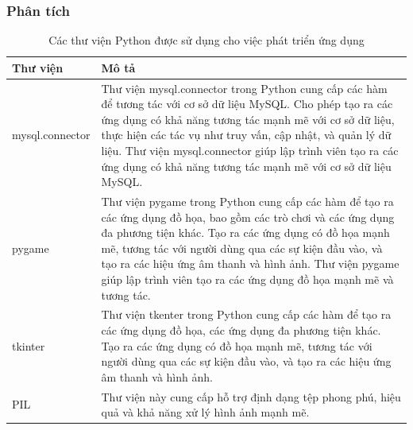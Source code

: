 \documentclass[a4paper]{article}
\begin{document}
\subsubsection{Phân tích}
\begin{table}[h]
	\centering
	\begin{tabular}{|l|p{10cm}|}
		\hline
		\textbf{Thư viện} & \textbf{Mô tả}                                                                                                                                                                                                                                                                                                                                                      \\
		\hline
		mysql.connector   & Thư viện mysql.connector trong Python cung cấp các hàm để tương tác với cơ sở dữ liệu MySQL. Cho phép tạo ra các ứng dụng có khả năng tương tác mạnh mẽ với cơ sở dữ liệu, thực hiện các tác vụ như truy vấn, cập nhật, và quản lý dữ liệu. Thư viện mysql.connector giúp lập trình viên tạo ra các ứng dụng có khả năng tương tác mạnh mẽ với cơ sở dữ liệu MySQL. \\
		\hline
		pygame            & Thư viện pygame trong Python cung cấp các hàm để tạo ra các ứng dụng đồ họa, bao gồm các trò chơi và các ứng dụng đa phương tiện khác. Tạo ra các ứng dụng có đồ họa mạnh mẽ, tương tác với người dùng qua các sự kiện đầu vào, và tạo ra các hiệu ứng âm thanh và hình ảnh. Thư viện pygame giúp lập trình viên tạo ra các ứng dụng đồ họa mạnh mẽ và tương tác.   \\
		\hline
		tkinter           & Thư viện tkenter trong Python cung cấp các hàm để tạo ra các ứng dụng đồ họa, các ứng dụng đa phương tiện khác. Tạo ra các ứng dụng có đồ họa mạnh mẽ, tương tác với người dùng qua các sự kiện đầu vào, và tạo ra các hiệu ứng âm thanh và hình ảnh.                                                                                                               \\
		\hline
		PIL               & Thư viện này cung cấp hỗ trợ định dạng tệp phong phú, hiệu quả và khả năng xử lý hình ảnh mạnh mẽ.                                                                                                                                                                                                                                                                  \\
		\hline
	\end{tabular}
	\caption{Các thư viện Python được sử dụng cho việc phát triển ứng dụng}
	\label{tab:my_label}
\end{table}
\clearpage
\newpage
\end{document}
